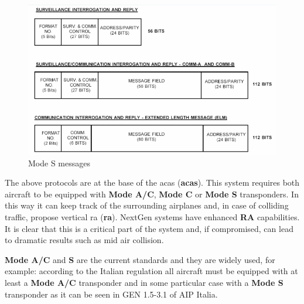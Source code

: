 \documentclass[../main.tex]{subfiles}
\begin{document}
\begin{figure}[htp]
  \centering
  \includegraphics[scale=0.65]{images/modes.png}
  \caption{Mode S messages}
  \label{fig:modes}
\end{figure}

The above protocols are at the base of the \acrlong{acas} (\textbf{\acrshort{acas}}). This system requires both aircraft to be equipped with \textbf{Mode A/C}, \textbf{Mode C} or \textbf{Mode S} transponders. In this way it can keep track of the surrounding airplanes and, in case of colliding traffic, propose vertical \acrlong{ra} (\textbf{\acrshort{ra}}). NextGen systems have enhanced \textbf{RA} capabilities. It is clear that this is a critical part of the system and, if compromised, can lead to dramatic results such as mid air collision.

\textbf{Mode A/C} and \textbf{S} are the current standards and they are widely used, for example: according to the Italian regulation all aircraft must be equipped with at least a \textbf{Mode A/C} transponder and in some particular case with a \textbf{Mode S} transponder as it can be seen in GEN 1.5-3.1 of AIP Italia\cite{itareg}.
\end{document}
